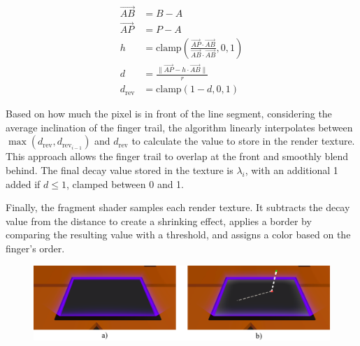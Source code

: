         \begin{figure}[h]
        \begin{equation}
        \begin{split} \label{eq:distance_line}
            \vec{AB} &= B - A \\
            \vec{AP} &= P - A \\
            h &= \mathrm{clamp} ( \frac{\vec{AP} \cdot \vec{AB}}{\vec{AB} \cdot \vec{AB}} , 0, 1)  \\
            d &= \frac{\| \vec{AP} - h \cdot \vec{AB} \|}{r} \\
            d_{\mathrm{rev}} &= \mathrm{clamp} ( 1 - d , 0 , 1)
        \end{split}
        \end{equation}
        \end{figure}




        Based on how much the pixel is in front of the line segment, considering the average inclination of the finger trail, the algorithm linearly interpolates between \(\max(d_{\text{rev}}, d_{\text{rev}_{i-1}})\) and \(d_{\text{rev}}\) to calculate the value to store in the render texture. This approach allows the finger trail to overlap at the front and smoothly blend behind. The final decay value stored in the texture is \(\lambda_i\), with an additional 1 added if \(d \leq 1\), clamped between 0 and 1.

        Finally, the fragment shader samples each render texture. It subtracts the decay value from the distance to create a shrinking effect, applies a border by comparing the resulting value with a threshold, and assigns a color based on the finger's order.

        \begin{figure}[h!]
            \centering
            \includegraphics[width=1\textwidth]{figures/frame_glow.png}
            \label{fig:frame_glow}
        \end{figure}

